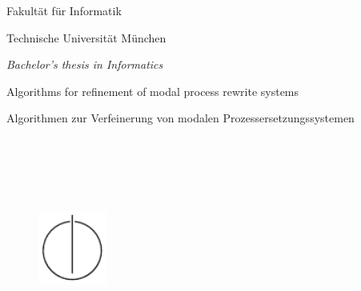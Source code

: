 \let\cleardoublepage\clearpage

\thispagestyle{empty}
\begin{titlepage}
  \begin{center}
    \begin{figure}[htp]
      \centering
      \oTUM{6cm}
    \end{figure}

    \vspace*{2\baselineskip}
    
    {\large{\scfont Fakultät für Informatik}}
    
    {\large {\scfont Technische Universität München}}
    
    \vspace{1.5cm}
    
    {\large \em Bachelor's thesis in Informatics}

    {\huge Algorithms for refinement of modal process rewrite systems}
    
    {\huge Algorithmen zur Verfeinerung von modalen Prozessersetzungssystemen}

    \vspace{1.0cm}
    \large{
                  \\
              \\
                 \\
         \\
    }
    
    \vspace{1.0cm}
    
    \begin{figure}[htp]
      \centering
      \includegraphics[width=0.20\textwidth]{IN_schwarz_CMYK.pdf}
    \end{figure}
  
  \end{center}
\end{titlepage}

